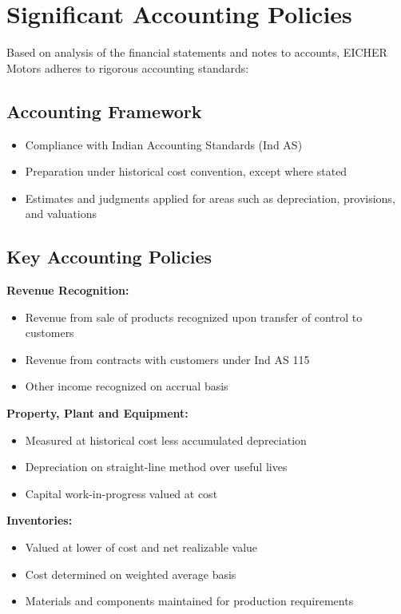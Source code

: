 \documentclass[8pt,a4paper]{article}
\begin{document}
\section{Significant Accounting Policies}

Based on analysis of the financial statements and notes to accounts, EICHER Motors adheres to rigorous accounting standards:

\subsection{Accounting Framework}
\begin{itemize}
    \item Compliance with Indian Accounting Standards (Ind AS)
    \item Preparation under historical cost convention, except where stated
    \item Estimates and judgments applied for areas such as depreciation, provisions, and valuations
\end{itemize}

\subsection{Key Accounting Policies}

\textbf{Revenue Recognition:}
\begin{itemize}
    \item Revenue from sale of products recognized upon transfer of control to customers
    \item Revenue from contracts with customers under Ind AS 115
    \item Other income recognized on accrual basis
\end{itemize}

\textbf{Property, Plant and Equipment:}
\begin{itemize}
    \item Measured at historical cost less accumulated depreciation
    \item Depreciation on straight-line method over useful lives
    \item Capital work-in-progress valued at cost
\end{itemize}

\textbf{Inventories:}
\begin{itemize}
    \item Valued at lower of cost and net realizable value
    \item Cost determined on weighted average basis
    \item Materials and components maintained for production requirements
\end{itemize}
\end{document}
